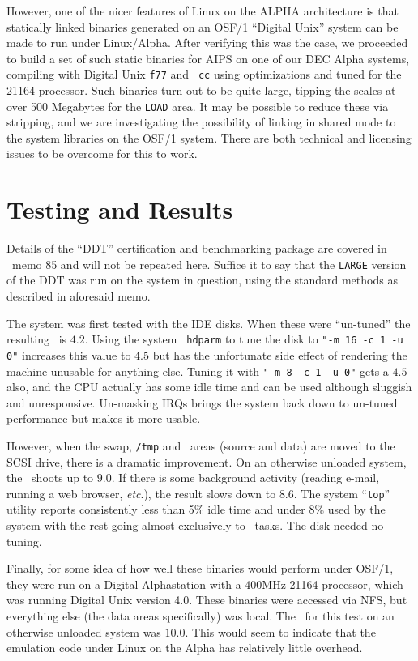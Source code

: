 However, one of the nicer features of Linux on the ALPHA architecture is
that statically linked binaries generated on an OSF/1 ``Digital Unix''
system can be made to run under Linux/Alpha.  After verifying this was the
case, we proceeded to build a set of such static binaries for AIPS on one
of our DEC Alpha systems, compiling with Digital Unix {\tt f77} and {\tt
cc} using optimizations and tuned for the 21164 processor.  Such binaries
turn out to be quite large, tipping the scales at over 500 Megabytes for
the {\tt LOAD} area.  It may be possible to reduce these via stripping,
and we are investigating the possibility of linking in shared mode to the
system libraries on the OSF/1 system.  There are both technical and
licensing issues to be overcome for this to work.

\vfill\eject %

\section{Testing and Results}

Details of the ``DDT'' certification and benchmarking package are covered
in \AIPS\ memo 85 and will not be repeated here.  Suffice it to say that
the {\tt LARGE} version of the DDT was run on the system in question,
using the standard methods as described in aforesaid memo.

The system was first tested with the IDE disks.  When these were
``un-tuned'' the resulting \AMark\ is $4.2$.  Using the system {\tt
hdparm} to tune the disk to {\tt "-m 16 -c 1 -u 0"} increases this value
to $4.5$ but has the unfortunate side effect of rendering the machine
unusable for anything else.  Tuning it with {\tt "-m 8 -c 1 -u 0"} gets a
$4.5$ also, and the CPU actually has some idle time and
can be used although sluggish and unresponsive.  Un-masking IRQs brings
the system back down to un-tuned performance but makes it more usable.

However, when the swap, {\tt /tmp} and \AIPS\ areas (source and data) are
moved to the SCSI drive, there is a dramatic improvement.  On an otherwise
unloaded system, the \AMark\ shoots up to $9.0$.  If there is some
background activity (reading e-mail, running a web browser, {\it etc\/}.),
the result slows down to $8.6$.  The system ``{\tt top}'' utility reports
consistently less than 5\% idle time and under 8\% used by the system with
the rest going almost exclusively to \AIPS\ tasks.  The disk needed no
tuning.

Finally, for some idea of how well these binaries would perform under
OSF/1, they were run on a Digital Alphastation with a 400MHz 21164
processor, which was running Digital Unix version 4.0.  These binaries
were accessed via NFS, but everything else (the data areas specifically)
was local.  The \AMark\ for this test on an otherwise unloaded system was
$10.0$.  This would seem to indicate that the emulation code under Linux
on the Alpha has relatively little overhead.


